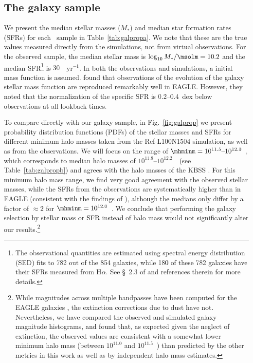 \documentclass[useAMS,usenatbib,letterpaper]{mn2e}
\begin{document}
\subsection{The galaxy sample}

We present the median stellar masses ($ M_{\ast}$) and median star formation rates (SFRs)
for each \mhmin\ sample in Table~\ref{tab:galpropa}. We note that these are the true
values measured directly from the simulations, not from virtual observations. 
For the observed sample, the median stellar mass is
$\log_{10} M_{\ast} / \msolm = 10.2$ and the median SFR\footnote{
The observational quantities are estimated 
using spectral energy distribution (SED) fits
to 782 out of the 854 galaxies, while 180 of these 782 galaxies
have their SFRs measured from H$\alpha$. See \S~2.3 of \citet{steidel14}
and references therein for more details.} is $30$~\msol~yr$^{-1}$.
In both the observations and simulations, a \citet{chabrier03} initial 
mass function is assumed.
\citet{furlong15} found that observations of the evolution of the galaxy
stellar mass function are reproduced remarkably well in EAGLE.
However, they noted that the normalization of the specific SFR is 0.2--0.4~dex
below observations at all lookback times. 

To compare directly with our 
galaxy sample, in Fig.~\ref{fig:galprop} we present probability distribution functions
(PDFs) of the 
stellar masses and SFRs for different minimum halo masses taken
from the Ref-L100N1504 simulation, as well as from the observations. 
We will focus on the range of $\mhminm=10^{11.5}\text{--}10^{12.0}$~\msol,
which corresponds to median halo masses of $10^{11.8}$--$10^{12.2}$~\msol\ (see 
Table~\ref{tab:galpropb}) and agrees with the halo masses of the KBSS
\citep{trainor12, rakic13}. 
For this minimum halo mass range, we 
find very good agreement with the observed stellar masses,
while the SFRs from the observations are systematically higher than in 
EAGLE (consistent with the findings of \citealt{furlong15}), although
the medians only differ by a factor of $\approx2$ for $\mhminm=10^{12.0}$~\msol. 
We conclude that performing the galaxy selection by stellar mass or SFR
instead of halo mass would not significantly alter our results.\footnote{
While magnitudes across multiple bandpasses have been computed for the 
EAGLE galaxies \citep{trayford15, mcalpine16}, the extinction corrections due to dust have not. 
Nevertheless, we have compared the observed and simulated galaxy magnitude
histograms, and found that, as expected given the neglect of extinction, the observed values are consistent 
with a somewhat lower minimum halo mass (between $10^{11.0}$ and $10^{11.5}$~\msol) 
than predicted by the other metrics in this work as well as by independent
halo mass estimates.}
\end{document}
